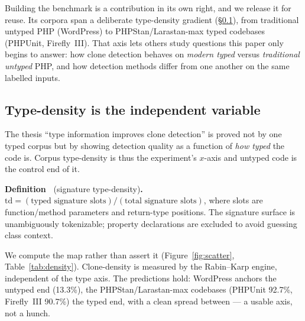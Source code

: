 \documentclass[10pt,a4paper]{article}
\newcounter{defn}[section]
\newcommand{\defn}[1]{\par\medskip\refstepcounter{defn}%
  \noindent\textbf{Definition~\thedefn} (#1)\textbf{.}\ }
\newcounter{prop}[section]
\begin{document}
Building the benchmark is a contribution in its own right, and we release it for reuse. Its corpora
span a deliberate type-density gradient (\S\ref{sec:typedensity}), from traditional untyped PHP
(WordPress) to PHPStan/Larastan-max typed codebases (PHPUnit, Firefly~III). That axis lets others
study questions this paper only begins to answer: how clone detection behaves on \emph{modern typed}
versus \emph{traditional untyped} PHP, and how detection methods differ from one another on the same
labelled inputs.

\subsection{Type-density is the independent variable}
\label{sec:typedensity}
The thesis ``type information improves clone detection'' is proved not by one typed corpus but by
showing detection quality as a function of \emph{how typed} the code is. Corpus type-density is thus
the experiment's $x$-axis and untyped code is the control end of it.

\defn{signature type-density}
$\mathrm{td} = (\text{typed signature slots}) / (\text{total signature slots})$, where slots are
function/method parameters and return-type positions. The signature surface is unambiguously
tokenizable; property declarations are excluded to avoid guessing class context.

We compute the map rather than assert it (Figure~\ref{fig:scatter}, Table~\ref{tab:density}).
Clone-density is measured by the Rabin--Karp engine, independent of the type axis. The predictions
hold: WordPress anchors the untyped end (13.3\%), the PHPStan/Larastan-max codebases (PHPUnit 92.7\%,
Firefly~III 90.7\%) the typed end, with a clean spread between --- a usable axis, not a hunch.
\end{document}
